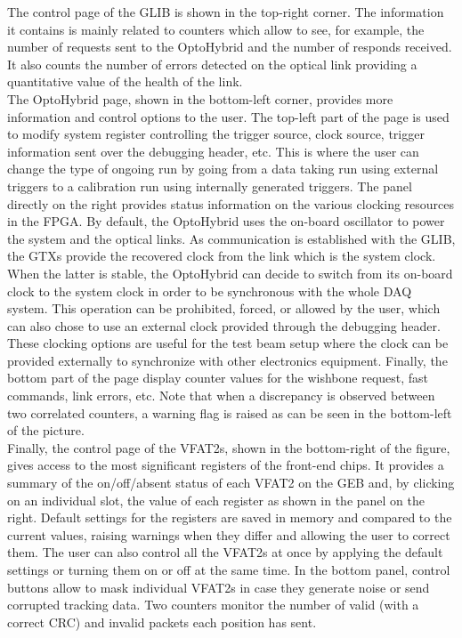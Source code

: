       The control page of the GLIB is shown in the top-right corner. The information it contains is mainly related to counters which allow to see, for example, the number of requests sent to the OptoHybrid and the number of responds received. It also counts the number of errors detected on the optical link providing a quantitative value of the health of the link. \\

      The OptoHybrid page, shown in the bottom-left corner, provides more information and control options to the user. The top-left part of the page is used to modify system register controlling the trigger source, clock source, trigger information sent over the debugging header, etc. This is where the user can change the type of ongoing run by going from a data taking run using external triggers to a calibration run using internally generated triggers. The panel directly on the right provides status information on the various clocking resources in the FPGA. By default, the OptoHybrid uses the on-board oscillator to power the system and the optical links. As communication is established with the GLIB, the GTXs provide the recovered clock from the link which is the system clock. When the latter is stable, the OptoHybrid can decide to switch from its on-board clock to the system clock in order to be synchronous with the whole DAQ system. This operation can be prohibited, forced, or allowed by the user, which can also chose to use an external clock provided through the debugging header. These clocking options are useful for the test beam setup where the clock can be provided externally to synchronize with other electronics equipment. Finally, the bottom part of the page display counter values for the wishbone request, fast commands, link errors, etc. Note that when a discrepancy is observed between two correlated counters, a warning flag is raised as can be seen in the bottom-left of the picture. \\

      Finally, the control page of the VFAT2s, shown in the bottom-right of the figure, gives access to the most significant registers of the front-end chips. It provides a summary of the on/off/absent status of each VFAT2 on the GEB and, by clicking on an individual slot, the value of each register as shown in the panel on the right. Default settings for the registers are saved in memory and compared to the current values, raising warnings when they differ and allowing the user to correct them. The user can also control all the VFAT2s at once by applying the default settings or turning them on or off at the same time. In the bottom panel, control buttons allow to mask individual VFAT2s in case they generate noise or send corrupted tracking data. Two counters monitor the number of valid (with a correct CRC) and invalid packets each position has sent.

